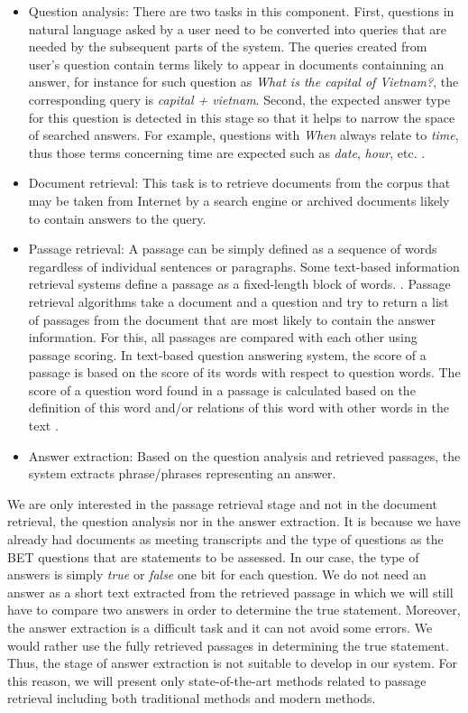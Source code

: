 \begin{itemize}
\item {Question analysis: There are two tasks in this component. First, questions in natural language asked by a user need to be converted into queries that are needed by the subsequent parts of the system. The queries created from user's question contain terms likely to appear in documents containning an answer, for instance for such question as \textit{What is the capital of Vietnam?}, the corresponding query is \textit{capital + vietnam}. Second, the expected answer type for this question is detected in this stage so that it helps to narrow the space of searched answers. For example, questions with \textit{When} always relate to \textit{time}, thus those terms concerning time are expected such as \textit{date}, \textit{hour}, etc. }.
\item {Document retrieval: This task is to retrieve documents from the corpus that may be taken from Internet by a search engine or archived documents likely to contain answers to the query.}
\item {Passage retrieval: A passage can be simply defined as a sequence of words regardless of individual sentences or paragraphs. Some text-based information retrieval systems define a passage as a fixed-length block of words. \cite{goharian2008dsp}. Passage retrieval algorithms take a document and a question and try to return a list of passages from the document that are most likely to contain the answer information. For this,  all passages are compared with each other using passage scoring. In text-based question answering system, the score of a passage is based on the score of its words with respect to question words. The score of a question word found in a passage is calculated based on the definition of this word and/or relations of this word with other words in the text \cite{tellex2003qep}.}
\item {Answer extraction: Based on the question analysis and retrieved passages, the system extracts phrase/phrases representing an answer.}
\end{itemize}

We are only interested in the passage retrieval stage and not in the document retrieval, the question analysis nor in the answer extraction. It is because we have already had documents as meeting transcripts and the type of questions as the BET questions that are statements to be assessed. In our case, the type of answers is simply \textit{true} or \textit{false} one bit for each question. We do not need an answer as a short text extracted from the retrieved passage in which we will still have to compare two answers in order to determine the true statement. Moreover, the answer extraction is a difficult task and it can not avoid some errors. We would rather use the fully retrieved passages in determining the true statement. Thus, the stage of answer extraction is not suitable to develop in our system. For this reason, we will present only state-of-the-art methods related to passage retrieval including both traditional methods and modern methods.


